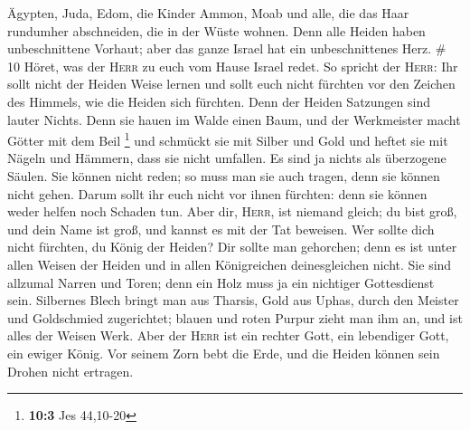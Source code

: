  Ägypten, Juda, Edom, die Kinder Ammon, Moab und alle,
die das Haar rundumher abschneiden, die in der Wüste wohnen. Denn alle
Heiden haben unbeschnittene Vorhaut; aber das ganze Israel hat ein
unbeschnittenes Herz. \# 10  Höret, was der \textsc{Herr}
zu euch vom Hause Israel redet.  So spricht der
\textsc{Herr}: Ihr sollt nicht der Heiden Weise lernen und sollt euch
nicht fürchten vor den Zeichen des Himmels, wie die Heiden sich
fürchten.  Denn der Heiden Satzungen sind lauter Nichts.
Denn sie hauen im Walde einen Baum, und der Werkmeister macht Götter mit
dem Beil \footnote{\textbf{10:3} Jes 44,10-20}  und
schmückt sie mit Silber und Gold und heftet sie mit Nägeln und Hämmern,
dass sie nicht umfallen.  Es sind ja nichts als überzogene
Säulen. Sie können nicht reden; so muss man sie auch tragen, denn sie
können nicht gehen. Darum sollt ihr euch nicht vor ihnen fürchten: denn
sie können weder helfen noch Schaden tun.  Aber dir,
\textsc{Herr}, ist niemand gleich; du bist groß, und dein Name ist groß,
und kannst es mit der Tat beweisen.  Wer sollte dich nicht
fürchten, du König der Heiden? Dir sollte man gehorchen; denn es ist
unter allen Weisen der Heiden und in allen Königreichen deinesgleichen
nicht.  Sie sind allzumal Narren und Toren; denn ein Holz
muss ja ein nichtiger Gottesdienst sein.  Silbernes Blech
bringt man aus Tharsis, Gold aus Uphas, durch den Meister und
Goldschmied zugerichtet; blauen und roten Purpur zieht man ihm an, und
ist alles der Weisen Werk.  Aber der \textsc{Herr} ist
ein rechter Gott, ein lebendiger Gott, ein ewiger König. Vor seinem Zorn
bebt die Erde, und die Heiden können sein Drohen nicht ertragen.


